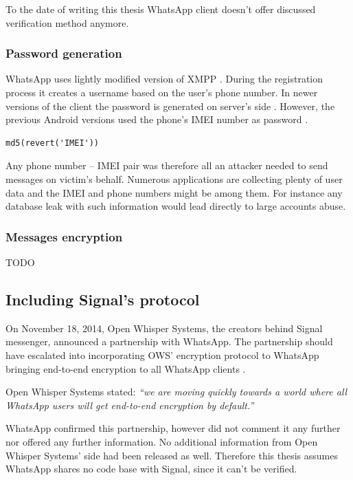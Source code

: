 \documentclass[thesis=M,english]{FITthesis}[2012/10/20]
\begin{document}
To the date of writing this thesis WhatsApp client doesn't offer discussed verification method anymore.


\subsubsection{Password generation}

WhatsApp uses lightly modified version of XMPP \cite{whatsapp-xmpp}. During the registration process it creates a username based on the user's phone number. In newer versions of the client the password is generated on server's side \cite{whatsapp-imei}. However, the previous Android versions used the phone's IMEI  number as password \cite{whatsapp-imei}\cite{whatsapp-imei2}.

\begin{lstlisting}[caption={Pseudo-code of password generation on Android}]
md5(revert('IMEI')) 
\end{lstlisting}

Any phone number -- IMEI pair was therefore all an attacker needed to send messages on victim's behalf. Numerous applications are collecting plenty of user data and the IMEI and phone numbers might be among them. For instance any database leak with such information would lead directly to large accounts abuse.

\subsubsection{Messages encryption}

TODO


\subsection{Including Signal's protocol}

On November 18, 2014, Open Whisper Systems, the creators behind Signal messenger, announced a partnership with WhatsApp. The partnership should have escalated into incorporating OWS' encryption protocol to WhatsApp bringing end-to-end encryption to all WhatsApp clients \cite{openwhisperwhatsapp}.

Open Whisper Systems stated: \emph{``we are moving quickly towards a world where all WhatsApp users will get end-to-end encryption by default.''} \cite{openwhisperwhatsapp}

WhatsApp confirmed this partnership, however did not comment it any further nor offered any further information\cite{x}. No additional information from Open Whisper Systems' side had been released as well. Therefore this thesis assumes WhatsApp shares no code base with Signal, since it can't be verified.
\end{document}
